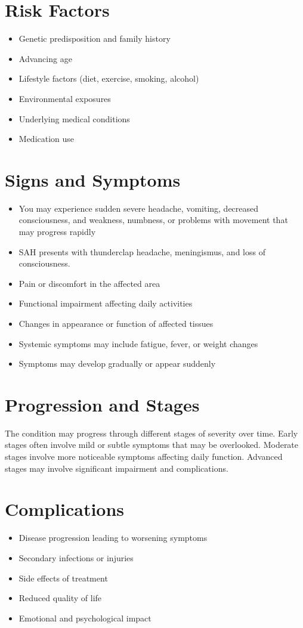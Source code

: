 \section{Risk Factors}
\begin{itemize}[noitemsep]
  \item Genetic predisposition and family history
  \item Advancing age
  \item Lifestyle factors (diet, exercise, smoking, alcohol)
  \item Environmental exposures
  \item Underlying medical conditions
  \item Medication use
\end{itemize}
\section{Signs and Symptoms}
\begin{itemize}[noitemsep]
  \item You may experience sudden severe headache, vomiting, decreased consciousness, and weakness, numbness, or problems with movement that may progress rapidly
  \item SAH presents with thunderclap headache, meningismus, and loss of consciousness.
  \item Pain or discomfort in the affected area
  \item Functional impairment affecting daily activities
  \item Changes in appearance or function of affected tissues
  \item Systemic symptoms may include fatigue, fever, or weight changes
  \item Symptoms may develop gradually or appear suddenly
\end{itemize}
\section{Progression and Stages}
The condition may progress through different stages of severity over time. Early stages often involve mild or subtle symptoms that may be overlooked. Moderate stages involve more noticeable symptoms affecting daily function. Advanced stages may involve significant impairment and complications.
\section{Complications}
\begin{itemize}[noitemsep]
  \item Disease progression leading to worsening symptoms
  \item Secondary infections or injuries
  \item Side effects of treatment
  \item Reduced quality of life
  \item Emotional and psychological impact
\end{itemize}
